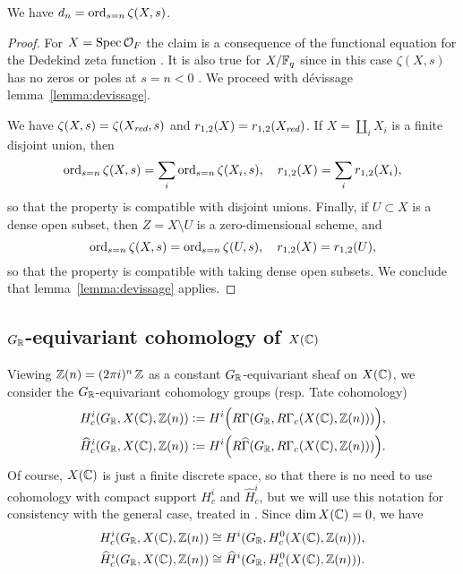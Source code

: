 \documentclass{article}
\numberwithin{equation}{section}
\begin{document}
\begin{proposition}
  \label{prop:vanishing-order-equals-dn}
  We have $d_n = \operatorname{ord}_{s = n} \zeta (X,s)$.

  \begin{proof}
    For $X = \operatorname{Spec} \mathcal{O}_F$ the claim is a consequence of the functional
    equation for the Dedekind zeta function \cite[\S VII.5]{Neukirch-1999}.
    It is also true for $X/\mathbb{F}_q$ since in this case $\zeta (X,s)$ has no zeros
    or poles at $s = n < 0$ \cite[pp.\,26--27]{Katz-1994}. We proceed with
    dévissage lemma~\ref{lemma:devissage}.

    We have $\zeta (X,s) = \zeta (X_{\text{\it red}},s)$ and
    $r_{1,2} (X) = r_{1,2} (X_{\text{\it red}})$.
    If $X = \coprod_i X_i$ is a finite disjoint union, then
    \[ \operatorname{ord}_{s = n} \zeta (X,s) = \sum_i \operatorname{ord}_{s = n} \zeta (X_i,s),
      \quad
      r_{1,2} (X) = \sum_i r_{1,2} (X_i), \]
    so that the property is compatible with disjoint unions. Finally, if
    $U \subset X$ is a dense open subset, then $Z = X\setminus U$ is
    a zero-dimensional scheme, and
    \[ \operatorname{ord}_{s = n} \zeta (X,s) = \operatorname{ord}_{s = n} \zeta (U,s),
      \quad
      r_{1,2} (X) = r_{1,2} (U), \]
    so that the property is compatible with taking dense open subsets.
    We conclude that lemma~\ref{lemma:devissage} applies.
  \end{proof}
\end{proposition}

\subsection*{$G_{\mathbb{R}}$-equivariant cohomology of $X(\mathbb{C})$}

Viewing $\mathbb{Z} (n) = (2\pi i)^n\,\mathbb{Z}$ as a constant $G_{\mathbb{R}}$-equivariant sheaf on
$X(\mathbb{C})$, we consider the $G_{\mathbb{R}}$-equivariant cohomology groups (resp. Tate
cohomology)
\begin{align*}
  H^i_c (G_{\mathbb{R}}, X(\mathbb{C}), \mathbb{Z}(n)) & \mathrel{\mathop:}= H^i \Bigl(R\Gamma (G_{\mathbb{R}}, R\Gamma_c (X(\mathbb{C}), \mathbb{Z}(n)))\Bigr), \\
  \widehat{H}^i_c (G_{\mathbb{R}}, X(\mathbb{C}), \mathbb{Z}(n)) & \mathrel{\mathop:}= H^i \Bigl(R\widehat{\Gamma} (G_{\mathbb{R}}, R\Gamma_c (X(\mathbb{C}), \mathbb{Z}(n)))\Bigr).
\end{align*}
Of course, $X(\mathbb{C})$ is just a finite discrete space, so that there is no need
to use cohomology with compact support $H^i_c$ and $\widehat{H}^i_c$, but we
will use this notation for consistency with the general case, treated in
\cite{Beshenov-Weil-etale-1}. Since $\dim X(\mathbb{C}) = 0$, we have
\begin{align*}
  H^i_c (G_{\mathbb{R}}, X(\mathbb{C}), \mathbb{Z}(n)) & \cong H^i (G_{\mathbb{R}}, H^0_c (X(\mathbb{C}), \mathbb{Z}(n))), \\
  \widehat{H}^i_c (G_{\mathbb{R}}, X(\mathbb{C}), \mathbb{Z}(n)) & \cong \widehat{H}^i (G_{\mathbb{R}}, H^0_c (X(\mathbb{C}), \mathbb{Z}(n))).
\end{align*}
\end{document}
